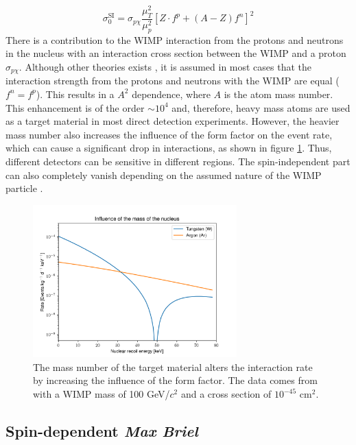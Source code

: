 \documentclass{article}
\begin{document}
\begin{equation}
    \sigma^\text{SI}_0 = \sigma_{p \chi} \frac{\mu_T^2}{\mu_p^2} \left[Z \cdot f^p + (A-Z) f^n \right]^2
\end{equation}
There is a contribution to the WIMP interaction from the protons and neutrons in the nucleus with an interaction cross section between the WIMP and a proton $\sigma_{p \chi}$. Although other theories exists \cite{Yaguna:2016bga}, it is assumed in most cases that the interaction strength from the protons and neutrons with the WIMP are equal ($f^n = f^p$). This results in a $A^2$ dependence, where $A$ is the atom mass number. This enhancement is of the order $\sim 10^4$ \cite{Vietze:2014vsa} and, therefore, heavy mass atoms are used as a target material in most direct detection experiments.
However, the heavier mass number also increases the influence of the form factor on the event rate, which can cause a significant drop in interactions, as shown in figure \ref{nucleus mass influence}. Thus, different detectors can be sensitive in different regions. The spin-independent part can also completely vanish depending on the assumed nature of the WIMP particle \cite{Lewin:1995rx}.


\begin{figure}[h]
    \centering
    \includegraphics[width=0.7\textwidth]{mass_influence.png}
    \caption{The mass number of the target material alters the interaction rate by increasing the influence of the form factor. The data comes from \cite{Undagoitia:2015gya} with a WIMP mass of 100 GeV/$c^2$ and a cross section of $10^{-45}$ cm$^2$.}
    \label{nucleus mass influence}
\end{figure}


\subsection{Spin-dependent \small{\textit{Max Briel}}}
\end{document}
